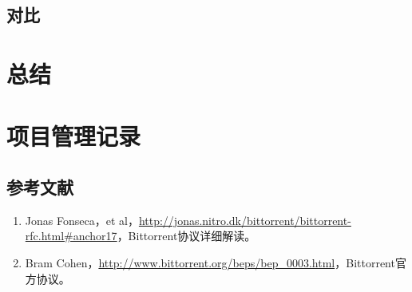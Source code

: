\documentclass[15pt]{ctexart}
\begin{document}
\subsection{对比} %
\label{sub:对比}


\section{总结} %
\label{sec:总结}


\section{项目管理记录} %
\label{sec:项目管理记录}


\newpage
\appendixpage
\begin{appendices}
	\section{参考文献} %
	\begin{enumerate}
		\item Jonas Fonseca，et al，\url{http://jonas.nitro.dk/bittorrent/bittorrent-rfc.html#anchor17}，Bittorrent协议详细解读。
		\item Bram Cohen，\url{http://www.bittorrent.org/beps/bep_0003.html}，Bittorrent官方协议。
	\end{enumerate}
\end{appendices}
\end{document}

